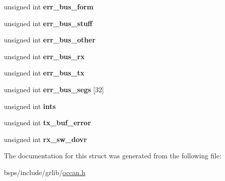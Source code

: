 \begin{DoxyCompactItemize}
\mbox{\label{structoccan__stats_ace76e9fd8b053705a5a208cef9a1f306}} 
unsigned int {\bfseries err\+\_\+bus\+\_\+form}
\item 
\mbox{\label{structoccan__stats_aa6aeb4d0fa037cf6462b7d063efa3aca}} 
unsigned int {\bfseries err\+\_\+bus\+\_\+stuff}
\item 
\mbox{\label{structoccan__stats_afaf85be4785db904ae34c037b29a98ac}} 
unsigned int {\bfseries err\+\_\+bus\+\_\+other}
\item 
\mbox{\label{structoccan__stats_af18ca8dfeee2934e025a9a92af45a0e9}} 
unsigned int {\bfseries err\+\_\+bus\+\_\+rx}
\item 
\mbox{\label{structoccan__stats_a9a5973d649a91f55f78bd534decc7004}} 
unsigned int {\bfseries err\+\_\+bus\+\_\+tx}
\item 
\mbox{\label{structoccan__stats_afa55d4df8cd36a082a4ed4d609dc449f}} 
unsigned int {\bfseries err\+\_\+bus\+\_\+segs} \mbox{[}32\mbox{]}
\item 
\mbox{\label{structoccan__stats_a1ee7a524129e0c91243f28280428424d}} 
unsigned int {\bfseries ints}
\item 
\mbox{\label{structoccan__stats_aa5d9094e15171fe9d77a2b716bf0ea76}} 
unsigned int {\bfseries tx\+\_\+buf\+\_\+error}
\item 
\mbox{\label{structoccan__stats_a755969b3a4aa6b005103862702448820}} 
unsigned int {\bfseries rx\+\_\+sw\+\_\+dovr}
\end{DoxyCompactItemize}


The documentation for this struct was generated from the following file\+:\begin{DoxyCompactItemize}
\item 
bsps/include/grlib/\mbox{\hyperlink{occan_8h}{occan.\+h}}\end{DoxyCompactItemize}

